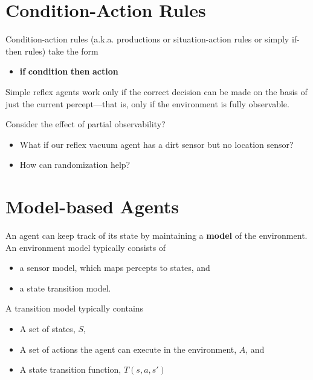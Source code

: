 \documentclass[11pt]{article}
\renewenvironment{quote}{\begin{shaded*}\begin{oldquote}}{\end{oldquote}\end{shaded*}}
\begin{document}
\section{Condition-Action Rules}
\label{sec:org4d72938}

Condition-action rules (a.k.a. productions or situation-action rules or simply if-then rules) take the form

\begin{itemize}
\item \textbf{if} \textbf{condition} \textbf{then} \textbf{action}
\end{itemize}

\begin{quote}
Simple reflex agents work only if the correct decision can be made on the basis of just the current percept—that is, only if the environment is fully observable.
\end{quote}

Consider the effect of partial observability?

\begin{itemize}
\item What if our reflex vacuum agent has a dirt sensor but no location sensor?
\item How can randomization help?
\end{itemize}
\section{Model-based Agents}
\label{sec:orgcea2f60}


An agent can keep track of its state by maintaining a \textbf{model} of the environment.  An environment model typically consists of

\begin{itemize}
\item a sensor model, which maps percepts to states, and
\item a state transition model.
\end{itemize}

A transition model typically contains

\begin{itemize}
\item A set of states, \(S\),
\item A set of actions the agent can execute in the environment, \(A\), and
\item A state transition function, \(T(s, a, s')\)
\end{itemize}
\end{document}
